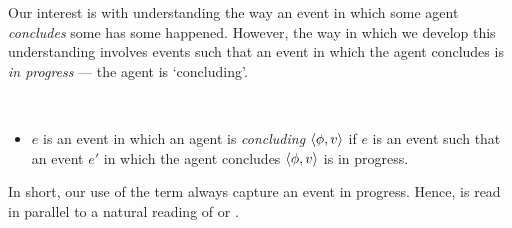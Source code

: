 \begin{note}
  Our interest is with understanding the way an event in which some agent \emph{concludes} some  has some  happened.
  However, the way in which we develop this understanding involves events such that an event in which the agent concludes is \emph{in progress} --- the agent is `concluding'.

  \begin{definition}
    \label{def:conclusionE}
    \mbox{ }
    \vspace{-\baselineskip}
    \begin{itemize}
    \item
      \(e\) is an event in which an agent is \emph{concluding} \(\langle \phi, v \rangle\) if \(e\) is an event such that an event \(e'\) in which the agent concludes \(\langle \phi, v \rangle\) is in progress.
    \end{itemize}
    \vspace{-\baselineskip}
  \end{definition}

  \noindent%
  In short, our use of the term  always capture an event in progress.
  Hence,  is read in parallel to a natural reading of  or .
\end{note}


